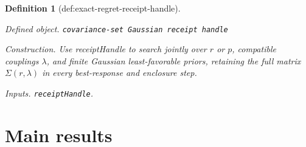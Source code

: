 \documentclass{article}
\newtheorem{definition}{Definition}
\begin{document}
\begin{definition}[def:exact-regret-receipt-handle]\label{def:exact-regret-receipt-handle}
\par\smallskip\noindent\emph{Defined object.} \texttt{covariance-\allowbreak{}set Gaussian receipt handle}
\par\smallskip\noindent\emph{Construction.} Use receiptHandle to search jointly over \(r\) or \(p\), compatible couplings \(\lambda\), and finite Gaussian least-favorable priors, retaining the full matrix \(\Sigma(r,\lambda)\) in every best-response and enclosure step.
\par\smallskip\noindent\emph{Inputs.} \texttt{receiptHandle}.
\end{definition}

\section{Main results}
\end{document}
